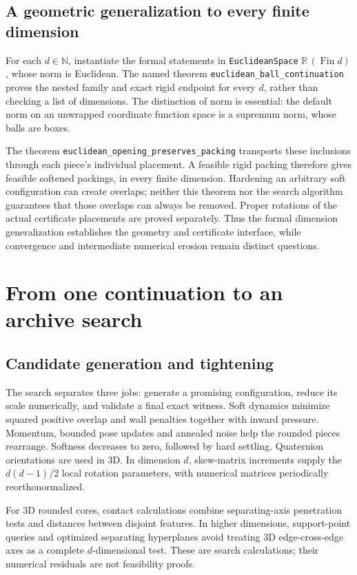 \documentclass[11pt,a4paper]{article}
\newcommand{\R}{\mathbb R}
\newcommand{\code}[1]{\texttt{\nolinkurl{#1}}}
\begin{document}
\subsection{A geometric generalization to every finite dimension}
For each $d\in\mathbb N$, instantiate the formal statements in \code{EuclideanSpace} $\R\,(\operatorname{Fin}d)$, whose norm is Euclidean. The named theorem \code{euclidean_ball_continuation} proves the nested family and exact rigid endpoint for every $d$, rather than checking a list of dimensions. The distinction of norm is essential: the default norm on an unwrapped coordinate function space is a supremum norm, whose balls are boxes.

The theorem \code{euclidean_opening_preserves_packing} transports these inclusions through each piece's individual placement. A feasible rigid packing therefore gives feasible softened packings, in every finite dimension. Hardening an arbitrary soft configuration can create overlaps; neither this theorem nor the search algorithm guarantees that those overlaps can always be removed. Proper rotations of the actual certificate placements are proved separately. Thus the formal dimension generalization establishes the geometry and certificate interface, while convergence and intermediate numerical erosion remain distinct questions.

\section{From one continuation to an archive search}
\subsection{Candidate generation and tightening}
The search separates three jobs: generate a promising configuration, reduce its scale numerically, and validate a final exact witness. Soft dynamics minimize squared positive overlap and wall penalties together with inward pressure. Momentum, bounded pose updates and annealed noise help the rounded pieces rearrange. Softness decreases to zero, followed by hard settling. Quaternion orientations are used in 3D. In dimension $d$, skew-matrix increments supply the $d(d-1)/2$ local rotation parameters, with numerical matrices periodically reorthonormalized.

For 3D rounded cores, contact calculations combine separating-axis penetration tests and distances between disjoint features. In higher dimensions, support-point queries and optimized separating hyperplanes avoid treating 3D edge-cross-edge axes as a complete $d$-dimensional test. These are search calculations; their numerical residuals are not feasibility proofs.
\end{document}
